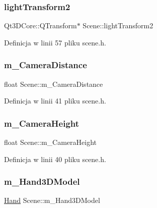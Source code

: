 \subsubsection{\texorpdfstring{light\+Transform2}{lightTransform2}}
{\footnotesize\ttfamily Qt3\+D\+Core\+::\+Q\+Transform$\ast$ Scene\+::light\+Transform2}



Definicja w linii 57 pliku scene.\+h.

\mbox{\label{class_scene_a8f666aa1574fd1a1ecae97fa55ad2be8}} 
\subsubsection{\texorpdfstring{m\+\_\+\+Camera\+Distance}{m\_CameraDistance}}
{\footnotesize\ttfamily float Scene\+::m\+\_\+\+Camera\+Distance}



Definicja w linii 41 pliku scene.\+h.

\mbox{\label{class_scene_af3aa76a49254de3b2ee5991677942ba3}} 
\subsubsection{\texorpdfstring{m\+\_\+\+Camera\+Height}{m\_CameraHeight}}
{\footnotesize\ttfamily float Scene\+::m\+\_\+\+Camera\+Height}



Definicja w linii 40 pliku scene.\+h.

\mbox{\label{class_scene_adf272488e380e731a1c20fa5cd208490}} 
\subsubsection{\texorpdfstring{m\+\_\+\+Hand3\+D\+Model}{m\_Hand3DModel}}
{\footnotesize\ttfamily \hyperlink{class_hand}{Hand} Scene\+::m\+\_\+\+Hand3\+D\+Model}



